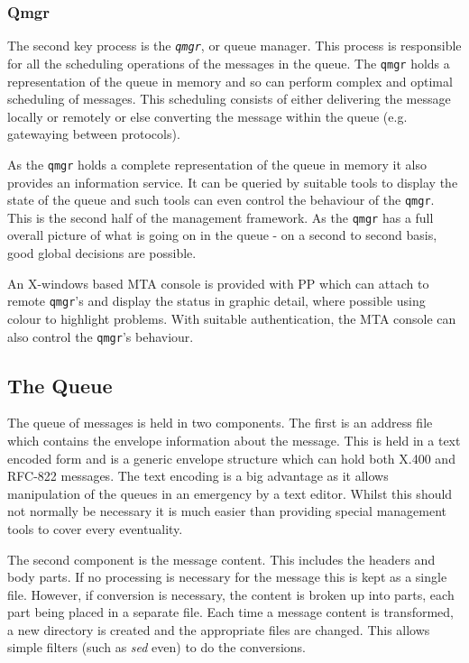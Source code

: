 \subsubsection{Qmgr}
The second key process is the {\em \verb|qmgr|}, or queue manager. This
process is responsible for all the scheduling operations of the
messages in the queue. The \verb|qmgr| holds a representation of the queue in
memory and so can perform complex and optimal scheduling of messages.
This scheduling consists of either delivering the message locally or
remotely or else converting the message within the queue (e.g.
gatewaying between protocols).

As the \verb|qmgr| holds a complete representation of the queue in memory it
also provides an information service. It can be queried by suitable
tools to display the state of the queue and such tools can even
control the behaviour of the \verb|qmgr|. This is the second half of the
management framework. As the \verb|qmgr| has a full overall picture of what
is going on in the queue - on a second to second basis, good global
decisions are possible.

An X-windows based MTA console is provided with PP which can attach
to remote \verb|qmgr|'s and display the status in graphic detail, where
possible using colour to highlight problems. With suitable
authentication, the MTA console can also control the \verb|qmgr|'s behaviour.

\subsection{The Queue}

The queue of messages is held in two components. The first is an
address file which contains the envelope information about the
message. This is held in a text encoded form and is a generic envelope
structure which can hold both X.400 and RFC-822 messages. The text
encoding is a big advantage as it allows manipulation of the queues in
an emergency by a text editor. Whilst this should not normally be
necessary it is much easier than providing special management tools
to cover every eventuality.

The second component is the message content. This includes the headers
and body parts. If no processing is necessary for the message this is
kept as a single file. However, if conversion is necessary, the
content is broken up into parts, each part being placed in a separate
file. Each time a message content is transformed, a new directory is
created and the appropriate files are changed. This allows simple
filters (such as {\em sed} even) to do the conversions.


